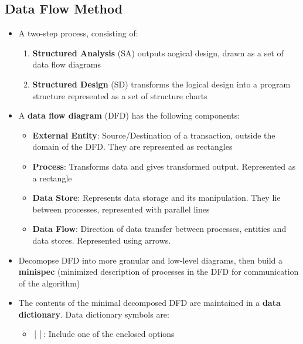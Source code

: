 \documentclass{article}
\begin{document}
\subsection{Data Flow Method}
\begin{itemize}
    \item A two-step process, consisting of:
    \begin{enumerate}
        \item \textbf{Structured Analysis} (SA) outputs aogical design, drawn as a set of data flow diagrams
        
        \item \textbf{Structured Design} (SD) transforms the logical design into a program structure represented as a set of structure charts
    \end{enumerate}
    
    \item A \textbf{data flow diagram} (DFD) has the following components:
    \begin{itemize}
        \item \textbf{External Entity}: Source/Destination of a transaction, outside the domain of the DFD. They are represented as rectangles
        
        \item \textbf{Process}: Transforms data and gives transformed output. Represented as a rectangle
        
        \item \textbf{Data Store}: Represents data storage and its manipulation. They lie between processes, represented with parallel lines
        
        \item \textbf{Data Flow}: Direction of data transfer between processes, entities and data stores. Represented using arrows. 
    \end{itemize}
    
    \item Decomopse DFD into more granular and low-level diagrams, then build a \textbf{minispec} (minimized description of processes in the DFD for communication of the algorithm)
    
    \item The contents of the minimal decomposed DFD are maintained in a \textbf{data dictionary}. Data dictionary symbols are:
    \begin{itemize}
        \item $[]$: Include one of the enclosed options
        

\end{itemize}
\end{itemize}
\end{document}
